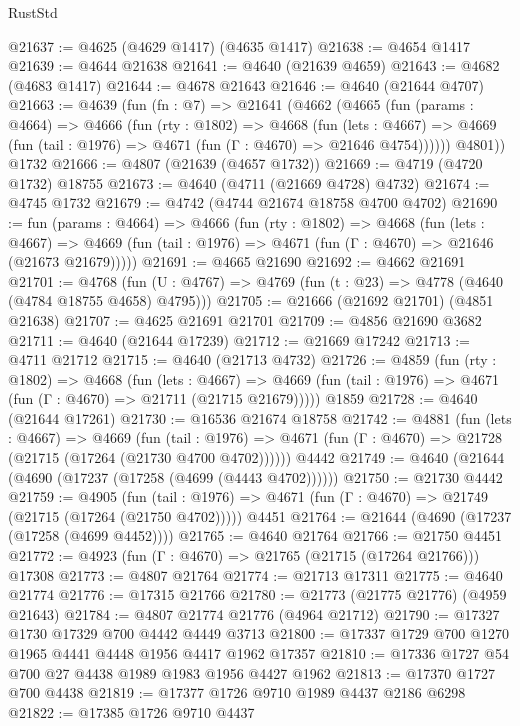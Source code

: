 \begin{lexlean}{RustStd}
\begin{coremodule}
@21637 := @4625 (@4629 @1417) (@4635 @1417)
@21638 := @4654 @1417
@21639 := @4644 @21638
@21641 := @4640 (@21639 @4659)
@21643 := @4682 (@4683 @1417)
@21644 := @4678 @21643
@21646 := @4640 (@21644 @4707)
@21663 := @4639
    (fun (fn : @7) =>
    @21641
      (@4662
        (@4665
          (fun (params : @4664) =>
          @4666
            (fun (rty : @1802) =>
            @4668
              (fun (lets : @4667) =>
              @4669 (fun (tail : @1976) => @4671 (fun (Γ : @4670) => @21646 @4754))))))
        @4801))
    @1732
@21666 := @4807 (@21639 (@4657 @1732))
@21669 := @4719 (@4720 @1732) @18755
@21673 := @4640 (@4711 (@21669 @4728) @4732)
@21674 := @4745 @1732
@21679 := @4742 (@4744 @21674 @18758 @4700 @4702)
@21690 := fun (params : @4664) =>
  @4666
    (fun (rty : @1802) =>
    @4668
      (fun (lets : @4667) =>
      @4669 (fun (tail : @1976) => @4671 (fun (Γ : @4670) => @21646 (@21673 @21679)))))
@21691 := @4665 @21690
@21692 := @4662 @21691
@21701 := @4768
    (fun (U : @4767) => @4769 (fun (t : @23) => @4778 (@4640 (@4784 @18755 @4658) @4795)))
@21705 := @21666 (@21692 @21701) (@4851 @21638)
@21707 := @4625 @21691 @21701
@21709 := @4856 @21690 @3682
@21711 := @4640 (@21644 @17239)
@21712 := @21669 @17242
@21713 := @4711 @21712
@21715 := @4640 (@21713 @4732)
@21726 := @4859
    (fun (rty : @1802) =>
    @4668
      (fun (lets : @4667) =>
      @4669 (fun (tail : @1976) => @4671 (fun (Γ : @4670) => @21711 (@21715 @21679)))))
    @1859
@21728 := @4640 (@21644 @17261)
@21730 := @16536 @21674 @18758
@21742 := @4881
    (fun (lets : @4667) =>
    @4669
      (fun (tail : @1976) =>
      @4671 (fun (Γ : @4670) => @21728 (@21715 (@17264 (@21730 @4700 @4702))))))
    @4442
@21749 := @4640 (@21644 (@4690 (@17237 (@17258 (@4699 (@4443 @4702))))))
@21750 := @21730 @4442
@21759 := @4905
    (fun (tail : @1976) => @4671 (fun (Γ : @4670) => @21749 (@21715 (@17264 (@21750 @4702)))))
    @4451
@21764 := @21644 (@4690 (@17237 (@17258 (@4699 @4452))))
@21765 := @4640 @21764
@21766 := @21750 @4451
@21772 := @4923 (fun (Γ : @4670) => @21765 (@21715 (@17264 @21766))) @17308
@21773 := @4807 @21764
@21774 := @21713 @17311
@21775 := @4640 @21774
@21776 := @17315 @21766
@21780 := @21773 (@21775 @21776) (@4959 @21643)
@21784 := @4807 @21774 @21776 (@4964 @21712)
@21790 := @17327 @1730 @17329 @700 @4442 @4449 @3713
@21800 := @17337 @1729 @700 @1270 @1965 @4441 @4448 @1956 @4417 @1962 @17357
@21810 := @17336 @1727 @54 @700 @27 @4438 @1989 @1983 @1956 @4427 @1962
@21813 := @17370 @1727 @700 @4438
@21819 := @17377 @1726 @9710 @1989 @4437 @2186 @6298
@21822 := @17385 @1726 @9710 @4437

\end{coremodule}
\end{lexlean}
